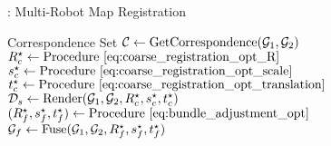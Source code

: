 \begin{algorithm2e}[th]
    \caption{\algname: Multi-Robot Map Registration}
    \label{alg:coarse_gaussian_registration}
    
    Correspondence Set $\mathcal{C} \gets \mathrm{GetCorrespondence}(\mathcal{G}_{1}, \mathcal{G}_{2})$\;    
    ${R_{c}^{\star} \gets \mathrm{Procedure~} \eqref{eq:coarse_registration_opt_R}}$\;
    ${s_{c}^{\star} \gets \mathrm{Procedure~} \eqref{eq:coarse_registration_opt_scale}}$\;
    ${t_{c}^{\star} \gets \mathrm{Procedure~} \eqref{eq:coarse_registration_opt_translation}}$\;
    ${\mathcal{D}_{s} \gets \mathrm{Render} (\mathcal{G}_{1}, \mathcal{G}_{2}, R_{c}^{\star}, s_{c}^{\star}, t_{c}^{\star})}$\;
    ${(R_{f}^{\star}, s_{f}^{\star}, t_{f}^{\star}) \gets \mathrm{Procedure~} \eqref{eq:bundle_adjustment_opt}}$\;
    ${\mathcal{G}_{f} \gets \mathrm{Fuse}(\mathcal{G}_{1}, \mathcal{G}_{2}, R_{f}^{\star}, s_{f}^{\star}, t_{f}^{\star})}$\;
\end{algorithm2e}